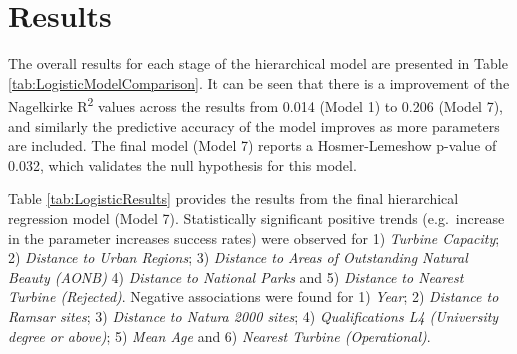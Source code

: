 \documentclass[a4paper,]{article}
\theoremstyle{definition}
\theoremstyle{definition}
\theoremstyle{definition}
\theoremstyle{remark}
\begin{document}
\hypertarget{results}{%
\section{Results}\label{results}}

The overall results for each stage of the hierarchical model are
presented in Table \ref{tab:LogisticModelComparison}. It can be seen
that there is a improvement of the Nagelkirke R\textsuperscript{2}
values across the results from 0.014 (Model 1) to 0.206 (Model 7), and
similarly the predictive accuracy of the model improves as more
parameters are included. The final model (Model 7) reports a
Hosmer-Lemeshow p-value of 0.032, which validates the null hypothesis
for this model.

\begin{table}[!h]

\caption{\label{tab:LogisticModelComparison}A summary of the hierarchical logistic regression models}
\centering
{}
\end{table}

Table \ref{tab:LogisticResults} provides the results from the final
hierarchical regression model (Model 7). Statistically significant
positive trends (e.g.~increase in the parameter increases success rates)
were observed for 1) \emph{Turbine Capacity}; 2) \emph{Distance to Urban
Regions}; 3) \emph{Distance to Areas of Outstanding Natural Beauty
(AONB)} 4) \emph{Distance to National Parks} and 5) \emph{Distance to
Nearest Turbine (Rejected)}. Negative associations were found for 1)
\emph{Year}; 2) \emph{Distance to Ramsar sites}; 3) \emph{Distance to
Natura 2000 sites}; 4) \emph{Qualifications L4 (University degree or
above)}; 5) \emph{Mean Age} and 6) \emph{Nearest Turbine (Operational)}.
\end{document}
